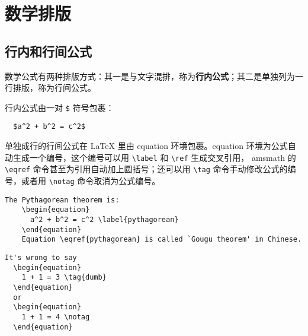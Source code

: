 

\chapter{数学排版}
\section{行内和行间公式}
数学公式有两种排版方式：其一是与文字混排，称为\textbf{行内公式}；其二是单独列为一行排版，称为行间公式。 

行内公式由一对 \texttt\$ 符号包裹：
\begin{lstlisting}
  $a^2 + b^2 = c^2$
\end{lstlisting}
\begin{center}
\end{center}
单独成行的行间公式在 \LaTeX{} 里由 equation 环境包裹。equation 环境为公式自动生成一个编号，这个编号可以用 \verb|\label| 和 \verb|\ref| 生成交叉引用，
amsmath 的 \verb|\eqref| 命令甚至为引用自动加上圆括号；还可以用 \verb|\tag| 命令手动修改公式的编号，或者用 \verb|\notag| 命令取消为公式编号。
\begin{lstlisting}[caption=多行公式示例一]
    The Pythagorean theorem is:
    \begin{equation}
      a^2 + b^2 = c^2 \label{pythagorean}
    \end{equation}
    Equation \eqref{pythagorean} is called `Gougu theorem' in Chinese.
\end{lstlisting}
\begin{center}
\end{center}
\clearpage
\begin{lstlisting}[caption=多行公式示例二]
  It's wrong to say
  \begin{equation}
    1 + 1 = 3 \tag{dumb}
  \end{equation}
  or
  \begin{equation}
    1 + 1 = 4 \notag
  \end{equation}
\end{lstlisting}
\begin{center}
\end{center}


